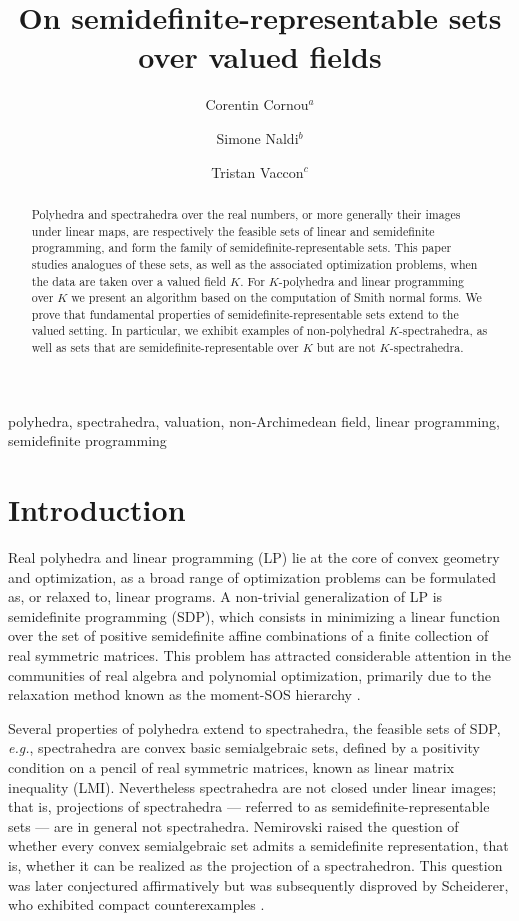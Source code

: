 \documentclass{elsarticle}
\author{Corentin Cornou$^a$}
\affiliation{
    organization={ENS Paris-Saclay},
    city={Gif-sur-Yvette},
    country={France}
}
\author{Simone Naldi$^b$}
\affiliation{ %
    organization={Università degli Studi di Cagliari, Palazzo delle Scienze, via Ospedale 72}, %
    city={Cagliari}, %
    country={Italy} %
} %
\author{Tristan Vaccon$^c$} %
\affiliation{
    organization={Université de Limoges, CNRS, XLIM},
    city={Limoges},
    country={France}
}
\theoremstyle{plain}
\theoremstyle{definition}
\begin{document}
\title{On semidefinite-representable sets over valued fields}

\begin{abstract}
  Polyhedra and spectrahedra over the real numbers, or more generally
  their images under linear maps, are respectively the feasible sets
  of linear and semidefinite
  programming, and form the family of semidefinite-representable sets.
  This paper studies analogues of these sets, as well as
  the associated optimization problems, when the data are taken over a valued 
  field $K$.
  For $K$-polyhedra and linear programming over $K$ we present an algorithm
  based on the computation of Smith normal forms.
  We prove that fundamental properties of semidefinite-representable sets extend
  to the valued setting.
  In particular, we exhibit examples of non-polyhedral $K$-spectrahedra, as well as
 sets that are semidefinite-representable over $K$ but are not $K$-spectrahedra.
\end{abstract}

\begin{keyword}
  polyhedra, spectrahedra, valuation, non-Archimedean field, linear programming, semidefinite programming
\end{keyword}

\maketitle

\section{Introduction}
\label{sec:intro}

Real polyhedra and linear programming (LP) lie at the core
of convex geometry and optimization, as a broad range
of optimization problems can be formulated as, or relaxed to, linear programs.
A non-trivial generalization of LP is semidefinite programming (SDP),
which consists in minimizing a linear function over the set of
positive semidefinite affine combinations of a finite collection of
real symmetric matrices.
This problem has attracted considerable attention in the
communities of real algebra and polynomial optimization,
primarily due to the relaxation method known as the moment-SOS hierarchy
\cite{henrion2020moment}.

Several properties of polyhedra extend to spectrahedra, the feasible
sets of SDP, {\it e.g.}, spectrahedra are convex basic semialgebraic sets,
defined by a positivity condition on a pencil of real symmetric matrices,
known as linear matrix inequality (LMI).
Nevertheless spectrahedra are not closed under linear images; that is,
projections of spectrahedra --- referred to as semidefinite-representable sets ---
are in general not spectrahedra. Nemirovski
\cite{nemirovski2007advances} raised the question of whether every convex semialgebraic set admits
a semidefinite representation, that is, whether it can be realized as the projection
of a spectrahedron. This question was later conjectured affirmatively \cite{helton_sufficient_2008} 
but was subsequently disproved by Scheiderer, who
exhibited compact counterexamples \cite{scheiderer_spectrahedral_2017}.
\end{document}
